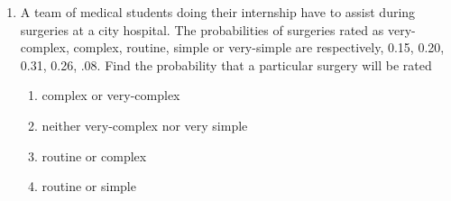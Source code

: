 \begin{enumerate}[label=\thesubsection.\arabic*,ref=\thesubsection.\theenumi]
\begin{table}[htb]

%	
	\caption{}
\label{tab:ncert/12/13/2/15}
\end{table}	
%
	\item A team of medical students doing their internship have to assist during surgeries at a city hospital. The probabilities of surgeries rated as very-complex, complex, routine, simple or very-simple are respectively, 0.15, 0.20, 0.31, 0.26, .08. Find the probability that a particular surgery will be rated
		\begin{multicols}{2}
\begin{enumerate}
\item complex or very-complex
\item neither very-complex nor very simple
\item routine or complex
\item routine or simple
\end{enumerate}
\end{multicols}
		\solution
		
\begin{table}[htb]\centering
	
	\caption{}
	\label{tab:exemplar/11/16/3/8/table2}
\end{table}	
\end{enumerate}
